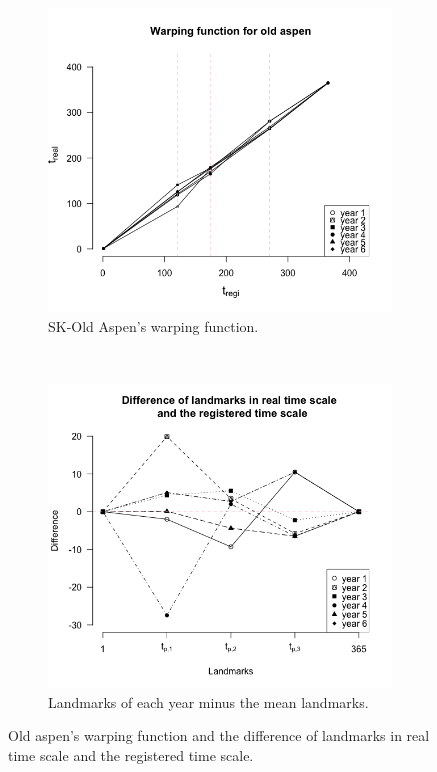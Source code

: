 \documentclass{article}\usepackage[]{graphicx}\usepackage[]{color}
\begin{document}
\begin{figure}[!ht]
    \centering
    \begin{subfigure}[ht]{0.45\textwidth}
        \includegraphics[width=\textwidth]{WarppingOAP4.png}
        \caption{SK-Old Aspen's warping function.}\label{Fig:warpOAP}
    \end{subfigure}
     ~
      \begin{subfigure}[ht]{0.45\textwidth}
        \includegraphics[width=\textwidth]{LandmarkDiff3.png}
        \caption{Landmarks of each year minus the mean landmarks.}\label{Fig:warpDiff}
     \end{subfigure}
    \caption{Old aspen's warping function and the difference of landmarks in real time scale and the registered time scale.}\label{Fig:warping}
\end{figure}
\end{document}
